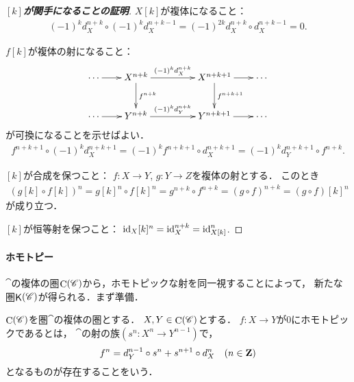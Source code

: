 \begin{proof}[\textbf{$[k]$が関手になることの証明}]
    $X[k]$が複体になること：
    \begin{align*}
        (-1)^kd_X^{n+k}\circ (-1)^kd_X^{n+k-1}
        =(-1)^{2k}d_X^{n+k}\circ d_X^{n+k-1}=0.
    \end{align*} 

    $f[k]$が複体の射になること：
    \begin{equation*}
        \vcenter{\xymatrix
        @C=20pt@R=26pt
        {
        \cdots \ar[r]
        & 
        X^{n+k}
        \ar[rr]^-{(-1)^kd_X^{n+k}}
        \ar[d]^-{f^{n+k}}
        &&
        X^{n+k+1}
        \ar[r]
        \ar[d]^-{f^{n+k+1}} 
        &\cdots
        \\
        \cdots \ar[r]
        & 
        Y^{n+k}
        \ar[rr]^-{(-1)^kd_Y^{n+k}}
        &&
        Y^{n+k+1}
        \ar[r]
        &\cdots
        }}
    \end{equation*}
    が可換になることを示せばよい．
    \begin{align*}
        f^{n+k+1}\circ (-1)^{k}d_X^{n+k+1}
        =(-1)^{k}f^{n+k+1}\circ d_X^{n+k+1}
        =(-1)^{k}d_Y^{n+k+1}\circ f^{n+k}. 
    \end{align*}

    $[k]$が合成を保つこと：
    $f\colon X\to Y$, $g\colon Y\to Z$を複体の射とする．
    このとき
    \begin{align*}
        (g[k]\circ f[k])^n
        =g[k]^n\circ f[k]^n
        =g^{n+k}\circ f^{n+k}
        =(g\circ f)^{n+k}
        =(g\circ f)[k]^n        
    \end{align*}
    が成り立つ．

    $[k]$が恒等射を保つこと：
    $\mathop{\mathrm{id}}\nolimits_X[k]^n=\mathop{\mathrm{id}}\nolimits_X^{n+k}=\mathop{\mathrm{id}}\nolimits_{X[k]}^{n}$.
\end{proof}

\paragraph{ホモトピー}
$\cat$の複体の圏$\mathop{\mathrm{C}}\nolimits(\mathscr{C})$から，ホモトピックな射を同一視することによって，
新たな圏$\mathop{\mathsf{K}}\nolimits(\mathscr{C})$が得られる．まず準備．

$\mathop{\mathrm{C}}\nolimits(\mathscr{C})$を圏$\cat$の複体の圏とする．
$X,Y\in\mathop{\mathrm{C}}\nolimits(\mathscr{C})$とする．
$f\colon X\to Y$が0にホモトピックであるとは，
$\cat$の射の族$(s^n\colon X^n\to Y^{n-1})$で，
\begin{equation}
    f^n=d_Y^{n-1}\circ s^n+s^{n+1}\circ d_X^{n}\quad(n\in\mathbf{Z})
\end{equation}
となるものが存在することをいう．

